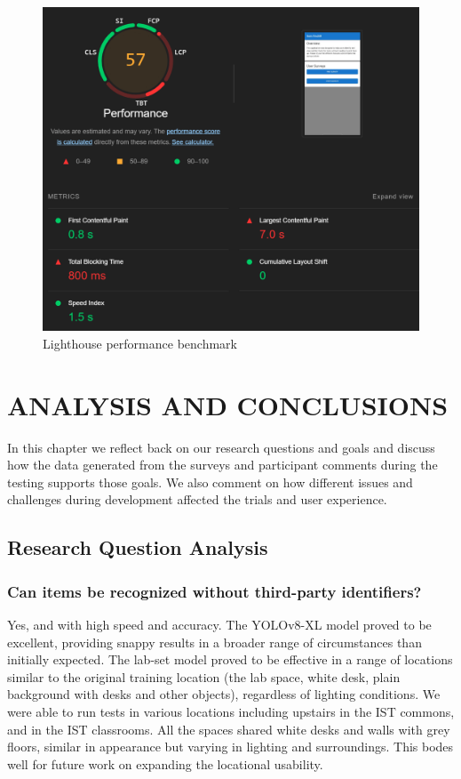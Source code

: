 \documentclass[thesis]{fputhesis}
\begin{document}
\begin{body}
\begin{figure}[h]
    \centering
    \includegraphics[width=0.7\linewidth]{Images/lighthouse performance.png}
    \caption{Lighthouse performance benchmark}
    \label{fig:light-perf}
\end{figure}

\chapter{ANALYSIS AND CONCLUSIONS}
In this chapter we reflect back on our research questions and goals and discuss how the data generated from the surveys and participant comments during the testing supports those goals. We also comment on how different issues and challenges during development affected the trials and user experience.

\section{Research Question Analysis}
\subsection{Can items be recognized without third-party identifiers?}
Yes, and with high speed and accuracy. The YOLOv8-XL model proved to be excellent, providing snappy results in a broader range of circumstances than initially expected. The lab-set model proved to be effective in a range of locations similar to the original training location (the lab space, white desk, plain background with desks and other objects), regardless of lighting conditions. We were able to run tests in various locations including upstairs in the IST commons, and in the IST classrooms. All the spaces shared white desks and walls with grey floors, similar in appearance but varying in lighting and surroundings. This bodes well for future work on expanding the locational usability.


\end{body}
\end{document}
